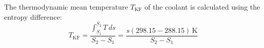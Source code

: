 The thermodynamic mean temperature \( T_{\text{KF}} \) of the coolant is calculated using the entropy difference:  
\[
T_{\text{KF}} = \frac{\int_{S_1}^{S_2} T \, ds}{S_2 - S_1} = \frac{s(298.15 - 288.15) \, \text{K}}{S_2 - S_1}
\]